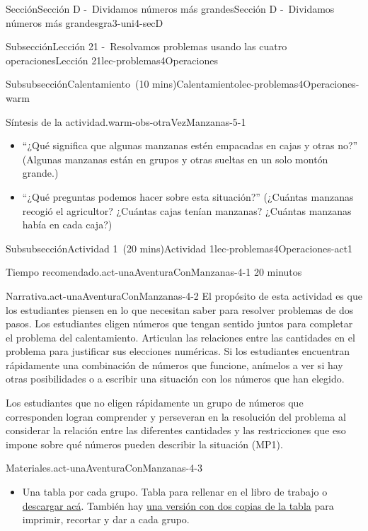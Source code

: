 \documentclass[oneside,10pt,]{article}
\begin{document}
\begin{sectionptx}{Sección}{Sección D -~Dividamos números más grandes}{}{Sección D -~Dividamos números más grandes}{}{}{gra3-uni4-secD}
\begin{subsectionptx}{Subsección}{Lección 21 -~Resolvamos problemas usando las cuatro operaciones}{}{Lección 21}{}{}{lec-problemas4Operaciones}
\begin{subsubsectionptx}{Subsubsección}{Calentamiento~(10 mins)}{}{Calentamiento}{}{}{lec-problemas4Operaciones-warm}
\begin{paragraphs}{Síntesis de la actividad.}{warm-obs-otraVezManzanas-5-1}%
%
\begin{itemize}[label=\textbullet]
\item{}``¿Qué significa que algunas manzanas estén empacadas en cajas y otras no?'' (Algunas manzanas están en grupos y otras sueltas en un solo montón grande.)%
\item{}``¿Qué preguntas podemos hacer sobre esta situación?'' (¿Cuántas manzanas recogió el agricultor? ¿Cuántas cajas tenían manzanas? ¿Cuántas manzanas había en cada caja?)%
\end{itemize}
\end{paragraphs}%
\end{subsubsectionptx}
%
%
\typeout{************************************************}
\typeout{************************************************}
%
\begin{subsubsectionptx}{Subsubsección}{Actividad 1~(20 mins)}{}{Actividad 1}{}{}{lec-problemas4Operaciones-act1}
\par
\begin{paragraphs}{Tiempo recomendado.}{act-unaAventuraConManzanas-4-1}%
20 minutos%
\end{paragraphs}%
\begin{paragraphs}{Narrativa.}{act-unaAventuraConManzanas-4-2}%
El propósito de esta actividad es que los estudiantes piensen en lo que necesitan saber para resolver problemas de dos pasos. Los estudiantes eligen números que tengan sentido juntos para completar el problema del calentamiento. Articulan las relaciones entre las cantidades en el problema para justificar sus elecciones numéricas. Si los estudiantes encuentran rápidamente una combinación de números que funcione, anímelos a ver si hay otras posibilidades o a escribir una situación con los números que han elegido.%
\par
Los estudiantes que no eligen rápidamente un grupo de números que corresponden logran comprender y perseveran en la resolución del problema al considerar la relación entre las diferentes cantidades y las restricciones que eso impone sobre qué números pueden describir la situación (MP1).%
\end{paragraphs}%
\begin{paragraphs}{Materiales.}{act-unaAventuraConManzanas-4-3}%
%
\begin{itemize}[label=\textbullet]
\item{}Una tabla por cada grupo. Tabla para rellenar en el libro de trabajo o \href{external/act-pdf/act-unaAventuraConManzanas.pdf}{descargar acá}\footnotemark{}. También hay \href{external/blm/tikz-source/3-4-21-act1-BLM-2up.pdf}{una versión con dos copias de la tabla}\footnotemark{} para imprimir, recortar y dar a cada grupo.%

\end{itemize}
\end{paragraphs}
\end{subsubsectionptx}
\end{subsectionptx}
\end{sectionptx}
\end{document}
